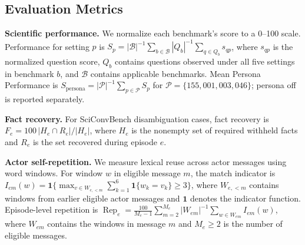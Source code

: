 \subsection{Evaluation Metrics}
\label{sec:metrics}

\noindent\textbf{Scientific performance.}
We normalize each benchmark's score to a 0--100 scale. Performance for setting $p$ is
$S_p=|\mathcal B|^{-1}\sum_{b\in\mathcal B}|Q_b|^{-1}\sum_{q\in Q_b}s_{qp}$,
where $s_{qp}$ is the normalized question score, $Q_b$ contains questions
observed under all five settings in benchmark $b$, and $\mathcal B$ contains
applicable benchmarks. Mean Persona Performance is
$S_{\mathrm{persona}}=|\mathcal P|^{-1}\sum_{p\in\mathcal P}S_p$ for
$\mathcal P=\{155,001,003,046\}$; persona off is reported separately.

\noindent\textbf{Fact recovery.}
For SciConvBench disambiguation cases, fact recovery is
$F_e=100\,|H_e\cap R_e|/|H_e|$, where $H_e$ is the nonempty set of required
withheld facts and $R_e$ is the set recovered during episode $e$.

\noindent\textbf{Actor self-repetition.}
We measure lexical reuse across actor messages using word windows.
For window $w$ in eligible message $m$, the match indicator is
$I_{em}(w)=\mathbf{1}\{\max_{v\in W_{e,<m}}\sum_{k=1}^{6}\mathbf{1}\{w_k=v_k\}\geq3\}$,
where $W_{e,<m}$ contains windows from earlier eligible actor messages and
$\mathbf{1}$ denotes the indicator function. Episode-level repetition is
$\operatorname{Rep}_e=\frac{100}{M_e-1}\sum_{m=2}^{M_e}|W_{em}|^{-1}\sum_{w\in W_{em}}I_{em}(w)$,
where $W_{em}$ contains the windows in message $m$ and $M_e\geq2$ is the
number of eligible messages.
